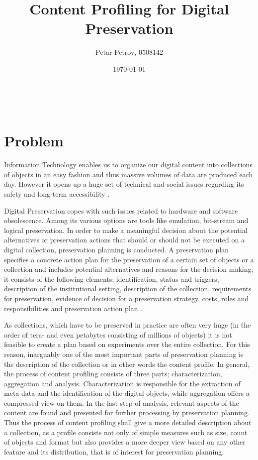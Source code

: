 \documentclass[a4paper,12pt]{scrartcl} %
\title{Content Profiling for Digital Preservation}
\author{Petar Petrov, 0508142}
\date{\today}
\makeatletter
\renewcommand{\maketitle}{\begingroup
    \let\footnotesize\small
    \let\footnoterule\relax
    \parindent \z@
    \reset@font
    \vskip 1\p@
    \begin{flushleft}
      \LARGE
      \strut\@title
    \end{flushleft}
    \@author \\
    \@date
    \vskip 40\p@
  \endgroup
  \setcounter{footnote}{0}%
}
\makeatother
\begin{document}
\maketitle

\section*{Problem}
Information Technology enables us to organize our digital content into collections of objects in an easy fashion and thus massive volumes of data are produced each day.
However it opens up a huge set of technical and social issues regarding its safety and long-term accessibility \cite{Lorie:2001:LTP:379437.379726}.

Digital Preservation copes with such issues related to hardware and software obsolescence. Among its various
options are tools like emulation, bit-stream and logical preservation. In order to make a meaningful decision
about the potential alternatives or preservation actions that should or should not be executed on a
digital collection, preservation planning is conducted. A preservation plan specifies a concrete action plan for the preservation
of a certain set of objects or a collection and includes potential alternatives and reasons for the decision making; it
consists of the following elements: identification, status and triggers, description of the institutional setting, description of the collection, requirements for preservation, evidence of decision for a preservation strategy, costs, roles and responsibilities and preservation action plan \cite{Becker:2009fk}. 

As collections, which have to be preserved in practice are often very huge (in the order of tera- and even petabytes consisting of millions of objects) it is not feasible to create a plan based on experiments over the entire collection. For this reason, inarguably one of the most important parts of preservation planning is the description of the collection or in other words the content profile. In general, the process of content profiling consists of three parts; characterization, aggregation and analysis. Characterization is responsible for the extraction of meta data and the identification of the digital objects, while aggregation offers a compressed view on them. In the last step of analysis, relevant aspects of the content are found and presented for further processing by preservation planning. Thus the process of content profiling shall give a more detailed description about a collection, as a profile consists not only of simple measures such as size, count of objects and format but also provides a more deeper view based on any other feature and its distribution, that is of interest for preservation planning.
\end{document}
